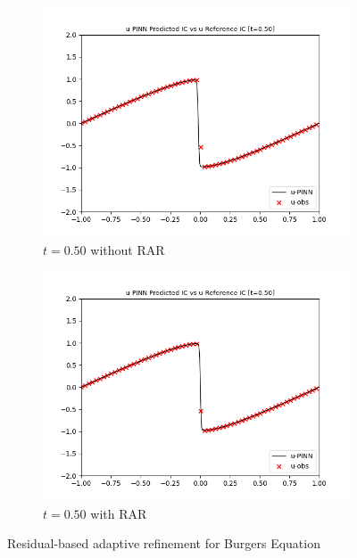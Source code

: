 \documentclass[letterpaper,11pt]{article}
\begin{document}
\begin{figure}[h]
\begin{subfigure}{0.45\textwidth}
            \includegraphics*[width=\textwidth]{burgers_forward_t0.50.png}
            \caption{$t = 0.50$ without RAR}
            \label{burgers_forward_t0.5}
        \end{subfigure}
        \hfill
        \begin{subfigure}{0.45\textwidth}
            \includegraphics*[width=\textwidth]{burgers_forward_t0.50_rar.png}
            \caption{$t = 0.50$ with RAR}
            \label{burgers_forward_t0.5_rar}
        \end{subfigure}
        \caption{Residual-based adaptive refinement for Burgers Equation}
    \end{figure}
\end{document}
